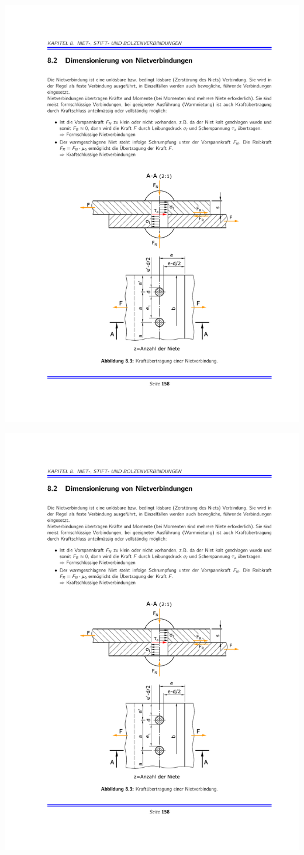 		\begin{center}
			\includegraphics[width=.75\columnwidth]{graphics/niete_2}
		\end{center}
		
		\includegraphics[width=\columnwidth]{graphics/niete_1}
